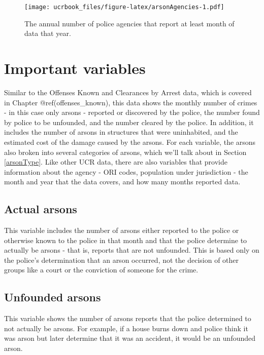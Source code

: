 \documentclass[
  12pt,
  openany]{book}
\begin{document}
\begin{figure}
\centering
\texttt{[image: ucrbook\_files/figure-latex/arsonAgencies-1.pdf]}
\caption{\label{fig:arsonAgencies}The annual number of police agencies that report at least month of data that year.}
\end{figure}

\hypertarget{important-variables-2}{%
\section{Important variables}\label{important-variables-2}}

Similar to the Offenses Known and Clearances by Arrest data, which is covered in Chapter @ref(offenses\_known), this data shows the monthly number of crimes - in this case only arsons - reported or discovered by the police, the number found by police to be unfounded, and the number cleared by the police. In addition, it includes the number of arsons in structures that were uninhabited, and the estimated cost of the damage caused by the arsons. For each variable, the arsons also broken into several categories of arsons, which we'll talk about in Section \ref{arsonType}. Like other UCR data, there are also variables that provide information about the agency - ORI codes, population under jurisdiction - the month and year that the data covers, and how many months reported data.

\hypertarget{actual-arsons}{%
\subsection{Actual arsons}\label{actual-arsons}}

This variable includes the number of arsons either reported to the police or otherwise known to the police in that month and that the police determine to actually be arsons - that is, reports that are not unfounded. This is based only on the police's determination that an arson occurred, not the decision of other groups like a court or the conviction of someone for the crime.

\hypertarget{unfounded-arsons}{%
\subsection{Unfounded arsons}\label{unfounded-arsons}}

This variable shows the number of arsons reports that the police determined to not actually be arsons. For example, if a house burns down and police think it was arson but later determine that it was an accident, it would be an unfounded arson.
\end{document}
